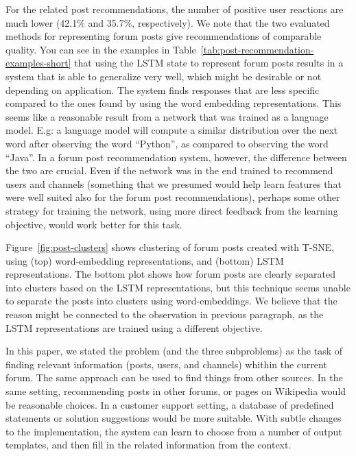 \documentclass[11pt]{article}
\newenvironment{reasonable}{\par\color{blue}}{\par}
\newenvironment{reasonable}{\par\color{black}}{\par}
\begin{document}
\vspace{1em}

\begin{reasonable}
For the related post recommendations, the number of positive user reactions are much lower (42.1\% and 35.7\%, respectively).
We note that the two evaluated methods for representing forum posts give recommendations of comparable quality.
You can see in the examples in Table~\ref{tab:post-recommendation-examples-short} that using the LSTM state to represent forum posts results in a system that is able to generalize very well, which might be desirable or not depending on application.
The system finds responses that are less specific compared to the ones found by using the word embedding representations.
This seems like a reasonable result from a network that was trained as a language model.
E.g: a language model will compute a similar distribution over the next word after observing the word ``Python'', as compared to observing the word ``Java''.
In a forum post recommendation system, however, the difference between the two are crucial.
Even if the network was in the end trained to recommend users and channels (something that we presumed would help learn features that were well suited also for the forum post recommendations), perhaps some other strategy for training the network, using more direct feedback from the learning objective, would work better for this task.
\end{reasonable}

Figure~\ref{fig:post-clusters} shows clustering of forum posts created with T-SNE, using (top) word-embedding representations, and (bottom) LSTM representations.
The bottom plot shows how forum posts are clearly separated into clusters based on the LSTM representations, but this technique seems unable to separate the posts into clusters using word-embeddings.
We believe that the reason might be connected to the observation in previous paragraph, as the LSTM representations are trained using a different objective.

In this paper, we stated the problem (and the three subproblems) as the task of finding relevant information (posts, users, and channels) whithin the current forum. The same approach can be used to find things from other sources. In the same setting, recommending posts in other forums, or pages on Wikipedia would be reasonable choices. In a customer support setting, a database of predefined statements or solution suggestions would be more suitable. With subtle changes to the implementation, the system can learn to choose from a number of output templates, and then fill in the related information from the context.
\end{document}
